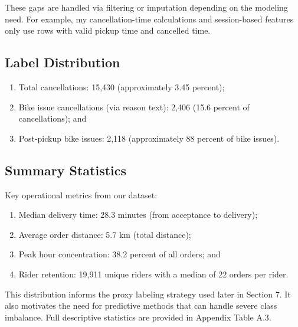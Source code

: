 These gaps are handled via filtering or imputation depending on the modeling need. For example, my cancellation-time calculations and session-based features only use rows with valid pickup time and cancelled time.

\subsection{Label Distribution}
\begin{enumerate}
    \item Total cancellations: 15,430 (approximately 3.45 percent);
    \item Bike issue cancellations (via reason text): 2,406 (15.6 percent of cancellations); and
    \item Post-pickup bike issues: 2,118 (approximately 88 percent of bike issues).
\end{enumerate}

\subsection{Summary Statistics}

Key operational metrics from our dataset:
\begin{enumerate}
    \item Median delivery time: 28.3 minutes (from acceptance to delivery);
    \item Average order distance: 5.7 km (total distance);
    \item Peak hour concentration: 38.2 percent of all orders; and
    \item Rider retention: 19,911 unique riders with a median of 22 orders per rider.
\end{enumerate}

This distribution informs the proxy labeling strategy used later in Section 7. It also motivates the need for predictive methods that can handle severe class imbalance. Full descriptive statistics are provided in Appendix Table A.3.